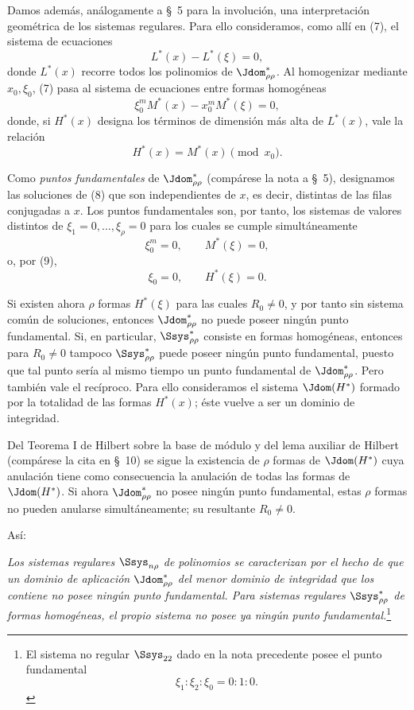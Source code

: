 \documentclass[11pt]{article}
\begin{document}
Damos además, análogamente a \S\ 5 para la involución, una interpretación geométrica de los sistemas regulares. Para ello consideramos, como allí en (7), el sistema de ecuaciones
\begin{equation}
  L^*(x)-L^*(\xi)=0,
\tag{7}
\end{equation}
donde $L^*(x)$ recorre todos los polinomios de $\Jdom^*_{\rho\rho}$. Al homogenizar mediante $x_0,\xi_0$, (7) pasa al sistema de ecuaciones entre formas homogéneas
\begin{equation}
  \xi_0^{m}M^*(x)-x_0^{m}M^*(\xi)=0,
\tag{8}
\end{equation}
donde, si $H^*(x)$ designa los términos de dimensión más alta de $L^*(x)$, vale la relación
\begin{equation}
  H^*(x)=M^*(x)\pmod{x_0}.
\tag{9}
\end{equation}

Como \emph{puntos fundamentales} de $\Jdom^*_{\rho\rho}$ (compárese la nota a \S\ 5), designamos las soluciones de (8) que son independientes de $x$, es decir, distintas de las filas conjugadas a $x$. Los puntos fundamentales son, por tanto, los sistemas de valores distintos de $\xi_1=0,\ldots,\xi_\rho=0$ para los cuales se cumple simultáneamente
\[
  \xi_0^m=0,
  \qquad M^*(\xi)=0,
\]
o, por (9),
\[
  \xi_0=0,
  \qquad H^*(\xi)=0.
\]

Si existen ahora $\rho$ formas $H^*(\xi)$ para las cuales $R_0\ne0$, y por tanto sin sistema común de soluciones, entonces $\Jdom^*_{\rho\rho}$ no puede poseer ningún punto fundamental. Si, en particular, $\Ssys^*_{\rho\rho}$ consiste en formas homogéneas, entonces para $R_0\ne0$ tampoco $\Ssys^*_{\rho\rho}$ puede poseer ningún punto fundamental, puesto que tal punto sería al mismo tiempo un punto fundamental de $\Jdom^*_{\rho\rho}$. Pero también vale el recíproco. Para ello consideramos el sistema $\Jdom(H^*)$ formado por la totalidad de las formas $H^*(x)$; éste vuelve a ser un dominio de integridad.

Del Teorema I de Hilbert sobre la base de módulo y del lema auxiliar de Hilbert (compárese la cita en \S\ 10) se sigue la existencia de $\rho$ formas de $\Jdom(H^*)$ cuya anulación tiene como consecuencia la anulación de todas las formas de $\Jdom(H^*)$. Si ahora $\Jdom^*_{\rho\rho}$ no posee ningún punto fundamental, estas $\rho$ formas no pueden anularse simultáneamente; su resultante $R_0\ne0$.

Así:

\emph{Los sistemas regulares $\Ssys_{n\rho}$ de polinomios se caracterizan por el hecho de que un dominio de aplicación $\Jdom^*_{\rho\rho}$ del menor dominio de integridad que los contiene no posee ningún punto fundamental. Para sistemas regulares $\Ssys^*_{\rho\rho}$ de formas homogéneas, el propio sistema no posee ya ningún punto fundamental.}\footnote{El sistema no regular $\Ssys_{22}$ dado en la nota precedente posee el punto fundamental
\[
  \xi_1:\xi_2:\xi_0=0:1:0.
\]}
\end{document}
